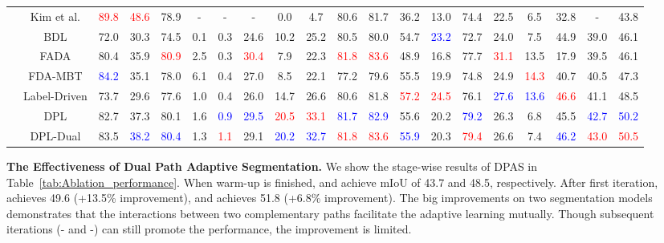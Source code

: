 \documentclass[10pt,twocolumn,letterpaper]{article}
\begin{document}
\begin{table*}[t!p]
\begin{tabular}{cccccccccccccccccccc}
&Kim et al. \cite{kim2020learning}  & \textcolor{red}{89.8}& \textcolor{red}{48.6}& 78.9&-&-&-&0.0& 4.7& 80.6& 81.7& 36.2& 13.0& 74.4& 22.5& 6.5& 32.8&-& 43.8  \\
&BDL \cite{li2019bidirectional}         & 72.0& 30.3& 74.5& 0.1& 0.3& 24.6& 10.2& 25.2& 80.5& 80.0& 54.7& \textcolor{blue}{23.2}& 72.7& 24.0& 7.5& 44.9& 39.0& 46.1 \\
&FADA \cite{wang2020classes}         & 80.4& 35.9& \textcolor{red}{80.9}& 2.5& 0.3& \textcolor{red}{30.4}& 7.9& 22.3& \textcolor{red}{81.8}& \textcolor{red}{83.6}& 48.9& 16.8& 77.7& \textcolor{red}{31.1}& 13.5& 17.9& 39.5& 46.1  \\
&FDA-MBT \cite{yang2020fda}  & \textcolor{blue}{84.2}& 35.1& 78.0& 6.1& 0.4& 27.0& 8.5& 22.1& 77.2& 79.6& 55.5& 19.9& 74.8& 24.9& \textcolor{red}{14.3}& 40.7& 40.5& 47.3  \\
&Label-Driven \cite{yang2020label}& 73.7& 29.6& 77.6& 1.0& 0.4& 26.0& 14.7& 26.6& 80.6& 81.8& \textcolor{red}{57.2}& \textcolor{red}{24.5}& 76.1& \textcolor{blue}{27.6}& \textcolor{blue}{13.6}& \textcolor{red}{46.6}& 41.1& 48.5  \\ 
\cline{2-20}
&DPL& 
82.7& 37.3& 80.1& 1.6& \textcolor{blue}{0.9}& \textcolor{blue}{29.5}& \textcolor{red}{20.5}& \textcolor{red}{33.1}& \textcolor{blue}{81.7}& \textcolor{blue}{82.9}& 55.6& 20.2& \textcolor{blue}{79.2}& 26.3& 6.8& 45.5& \textcolor{blue}{42.7}& \textcolor{blue}{50.2}
\\
&DPL-Dual &83.5& \textcolor{blue}{38.2}& \textcolor{blue}{80.4}& 1.3& \textcolor{red}{1.1}& 29.1& \textcolor{blue}{20.2}& \textcolor{blue}{32.7}& \textcolor{red}{81.8}& \textcolor{red}{83.6}& \textcolor{blue}{55.9}& 20.3& \textcolor{red}{79.4}& 26.6& 7.4& \textcolor{blue}{46.2}& \textcolor{red}{43.0}& \textcolor{red}{50.5}


\\
\bottomrule

\end{tabular}
\vspace{-1em}
\end{table*}

{\noindent \textbf{The Effectiveness of Dual Path Adaptive Segmentation.}}\hspace{3pt}
We show the stage-wise results of DPAS in Table~\ref{tab:Ablation_performance}. When warm-up is finished,  and  achieve mIoU of 43.7 and 48.5, respectively. After first iteration,  achieves 49.6 (+13.5{\%} improvement), and  achieves 51.8 (+6.8{\%} improvement). The big improvements on two segmentation models demonstrates that the interactions between two complementary paths facilitate the adaptive learning mutually. Though subsequent iterations (- and -) can still promote the performance, the improvement is limited.
\end{document}
